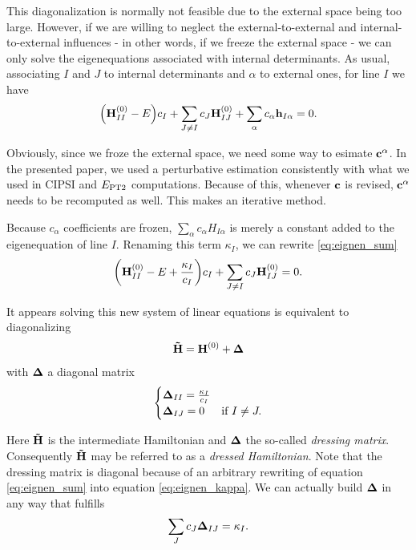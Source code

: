 \documentclass[./thesis.tex]{subfiles}
\begin{document}
This diagonalization is normally not feasible due to the external space being too large. However, if we are willing to neglect the external-to-external and internal-to-external influences - in other words, if we freeze the external space - we can only solve the eigenequations associated with internal determinants. As usual, associating $I$ and $J$ to internal determinants and $\alpha$ to external ones, for line $I$ we have
\begin{equation}
\qty({\bf H}^{(0)}_{II} - E)c_I  + \sum_{J \neq I} {c_J {\bf H}^{(0)}_{IJ}} + \sum_\alpha {c_\alpha {\bf h}_{I \alpha}} = 0.
\label{eq:eignen_sum}
\end{equation}


Obviously, since we froze the external space, we need some way to esimate ${\bf c}^\alpha$. In the presented paper, we used a perturbative estimation consistently with what we used in CIPSI and $E_\text{PT2}$ computations. Because of this, whenever $\bf c$ is revised, ${\bf c}^\alpha$ needs to be recomputed as well. This makes \Bk an iterative method.

Because $c_\alpha$ coefficients are frozen, $\sum_\alpha {c_\alpha H_{I \alpha}}$ is merely a constant added to the eigenequation of line $I$. Renaming this term $\kappa_I$, we can rewrite \ref{eq:eignen_sum}
\begin{equation}
\qty({\bf H}^{(0)}_{II} - E + \frac{\kappa_I}{c_I})c_I  + \sum_{J \neq I} {c_J {\bf H}^{(0)}_{IJ}} = 0.
\label{eq:eignen_kappa}
\end{equation}

It appears solving this new system of linear equations is equivalent to diagonalizing 
\begin{equation}
{\bf \tilde H} = {\bf H}^{(0)} + {\bf \Delta}
\end{equation}
with ${\bf \Delta}$ a diagonal matrix
\begin{equation}
\begin{cases}
{\bf \Delta}_{II}=\frac{\kappa_I}{c_I}\\
{\bf \Delta}_{IJ}=0 & \text{if } I \neq J.
\end{cases}
\end{equation}

Here ${\bf \tilde H}$ is the intermediate Hamiltonian and ${\bf \Delta}$ the so-called \emph{dressing matrix}. Consequently ${\bf \tilde H}$ may be referred to as a \emph{dressed Hamiltonian}. 
Note that the dressing matrix is diagonal because of an arbitrary rewriting of equation \ref{eq:eignen_sum} into equation \ref{eq:eignen_kappa}. We can actually build ${\bf \Delta}$ in any way that fulfills
\begin{equation}
\sum_J c_J {\bf \Delta}_{IJ}  = \kappa_I.
\label{eq:arbitrary_dressing}
\end{equation}
\end{document}
